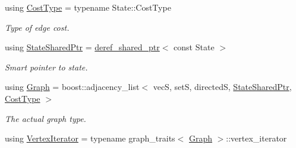 \begin{DoxyCompactItemize}
\item 
using \hyperlink{structslb_1_1core_1_1ui_1_1StateGraph_abd4aca3db1572710c32f035489deddef}{Cost\+Type} = typename State\+::\+Cost\+Type\hypertarget{structslb_1_1core_1_1ui_1_1StateGraph_abd4aca3db1572710c32f035489deddef}{}\label{structslb_1_1core_1_1ui_1_1StateGraph_abd4aca3db1572710c32f035489deddef}

\begin{DoxyCompactList}\small\item\em Type of edge cost. \end{DoxyCompactList}\item 
using \hyperlink{structslb_1_1core_1_1ui_1_1StateGraph_a367045176eaaf1580231bf5a4c35e2f8}{State\+Shared\+Ptr} = \hyperlink{classslb_1_1core_1_1util_1_1deref__shared__ptr}{deref\+\_\+shared\+\_\+ptr}$<$ const State $>$\hypertarget{structslb_1_1core_1_1ui_1_1StateGraph_a367045176eaaf1580231bf5a4c35e2f8}{}\label{structslb_1_1core_1_1ui_1_1StateGraph_a367045176eaaf1580231bf5a4c35e2f8}

\begin{DoxyCompactList}\small\item\em Smart pointer to state. \end{DoxyCompactList}\item 
using \hyperlink{structslb_1_1core_1_1ui_1_1StateGraph_af2cacea8f7165ee45140ff842a243c90}{Graph} = boost\+::adjacency\+\_\+list$<$ vecS, setS, directedS, \hyperlink{structslb_1_1core_1_1ui_1_1StateGraph_a367045176eaaf1580231bf5a4c35e2f8}{State\+Shared\+Ptr}, \hyperlink{structslb_1_1core_1_1ui_1_1StateGraph_abd4aca3db1572710c32f035489deddef}{Cost\+Type} $>$\hypertarget{structslb_1_1core_1_1ui_1_1StateGraph_af2cacea8f7165ee45140ff842a243c90}{}\label{structslb_1_1core_1_1ui_1_1StateGraph_af2cacea8f7165ee45140ff842a243c90}

\begin{DoxyCompactList}\small\item\em The actual graph type. \end{DoxyCompactList}\item 
using \hyperlink{structslb_1_1core_1_1ui_1_1StateGraph_a7743969e6b32517e10baca298625522b}{Vertex\+Iterator} = typename graph\+\_\+traits$<$ \hyperlink{structslb_1_1core_1_1ui_1_1StateGraph_af2cacea8f7165ee45140ff842a243c90}{Graph} $>$\+::vertex\+\_\+iterator\hypertarget{structslb_1_1core_1_1ui_1_1StateGraph_a7743969e6b32517e10baca298625522b}{}\label{structslb_1_1core_1_1ui_1_1StateGraph_a7743969e6b32517e10baca298625522b}


\end{DoxyCompactItemize}
